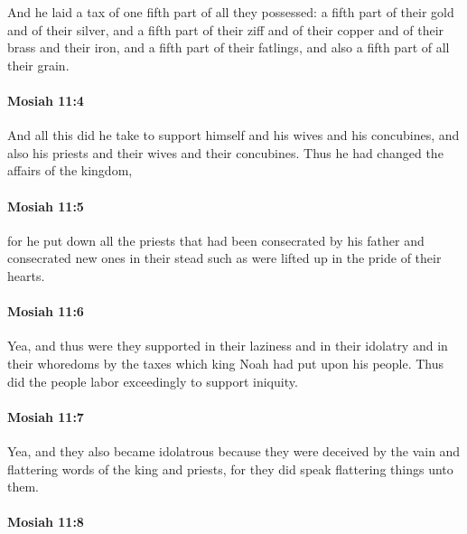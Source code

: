 			And he laid a tax of one fifth part of all they possessed:
			a fifth part of their gold and of their silver,
			and a fifth part of their ziff and of their copper and of their brass and their iron,
			and a fifth part of their fatlings,
			and also a fifth part of all their grain.

		\paragraph{Mosiah 11:4} %
			\label{MOSIAH-11-4}

			And all this did he take to support himself and his wives and his concubines,
			and also his priests and their wives and their concubines.
			Thus he had changed the affairs of the kingdom,

		\paragraph{Mosiah 11:5} %
			\label{MOSIAH-11-5}

			for he put down all the priests that had been consecrated by his father
			and consecrated new ones in their stead
			such as were lifted up in the pride of their hearts.

		\paragraph{Mosiah 11:6} %
			\label{MOSIAH-11-6}

			Yea, and thus were they supported in their laziness
			and in their idolatry and in their whoredoms
			by the taxes which king Noah had put upon his people.
			Thus did the people labor exceedingly to support iniquity.

		\paragraph{Mosiah 11:7} %
			\label{MOSIAH-11-7}

			Yea, and they also became idolatrous
			because they were deceived
			by the vain and flattering words of the king and priests,
			for they did speak flattering things unto them.

		\paragraph{Mosiah 11:8} %
			\label{MOSIAH-11-8}

